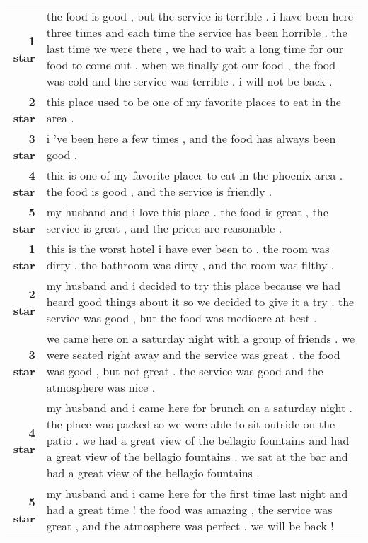 \documentclass{article}
\begin{document}
\begin{table*}[!thbp]
  \centering
  \small
  \begin{tabular}{r  p{12cm}}
    \toprule
    {\bf 1 star} & the food is good , but the service is terrible . i have been
                   here three times and each time the service has been horrible
                   . the last time we were there , we had to wait a long time
                   for our food to come out . when we finally got our food ,
                   the food was cold and the service was terrible . i will not
                   be back . \\
    {\bf 2 star} & this place used to be one of my favorite places to eat in
                    the area . \\
    {\bf 3 star} & i 've been here a few times , and the food has always been
                    good . \\
    {\bf 4 star} & this is one of my favorite places to eat in the phoenix
                    area . the food is good , and the service is friendly . \\
    {\bf 5 star} & my husband and i love this place . the food is great , the
                    service is great , and the prices are reasonable . \\
    \midrule

    {\bf 1 star} & this is the worst hotel i have ever been to . the room was dirty
                   , the bathroom was dirty , and the room was filthy .\\
    {\bf 2 star} & my husband and i decided to try this place because we had heard
                    good things about it so we decided to give it a try . the
                    service was good , but the food was mediocre at best . \\
    {\bf 3 star} & we came here on a saturday night with a group of friends . we
                    were seated right away and the service was great . the food was
                    good , but not great . the service was good and the atmosphere
                    was nice . \\
    {\bf 4 star} & my husband and i came here for brunch on a saturday night . the
                    place was packed so we were able to sit outside on the patio
                    . we had a great view of the bellagio fountains and had a great
                    view of the bellagio fountains . we sat at the bar and had a
                    great view of the bellagio fountains . \\
    {\bf 5 star} & my husband and i came here for the first time last night and
                    had a great time ! the food was amazing , the service was great
                    , and the atmosphere was perfect . we will be back ! \\
    \midrule


\end{tabular}
\end{table*}
\end{document}
